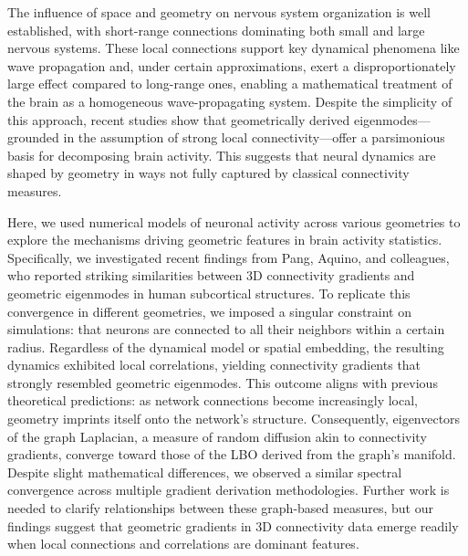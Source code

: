\documentclass{article}
\begin{document}
The influence of space and geometry on nervous system organization is well established, with short-range connections dominating both small and large nervous systems. These local connections support key dynamical phenomena like wave propagation and, under certain approximations, exert a disproportionately large effect compared to long-range ones, enabling a mathematical treatment of the brain as a homogeneous wave-propagating system. Despite the simplicity of this approach, recent studies show that geometrically derived eigenmodes---grounded in the assumption of strong local connectivity---offer a parsimonious basis for decomposing brain activity. This suggests that neural dynamics are shaped by geometry in ways not fully captured by classical connectivity measures.

Here, we used numerical models of neuronal activity across various geometries to explore the mechanisms driving geometric features in brain activity statistics. Specifically, we investigated recent findings from Pang, Aquino, and colleagues, who reported striking similarities between 3D connectivity gradients and geometric eigenmodes in human subcortical structures. To replicate this convergence in different geometries, we imposed a singular constraint on simulations: that neurons are connected to all their neighbors within a certain radius. Regardless of the dynamical model or spatial embedding, the resulting dynamics exhibited local correlations, yielding connectivity gradients that strongly resembled geometric eigenmodes. This outcome aligns with previous theoretical predictions: as network connections become increasingly local, geometry imprints itself onto the network’s structure. Consequently, eigenvectors of the graph Laplacian, a measure of random diffusion akin to connectivity gradients, converge toward those of the LBO derived from the graph's manifold. Despite slight mathematical differences, we observed a similar spectral convergence across multiple gradient derivation methodologies. Further work is needed to clarify relationships between these graph-based measures, but our findings suggest that geometric gradients in 3D connectivity data emerge readily when local connections and correlations are dominant features.
\end{document}
